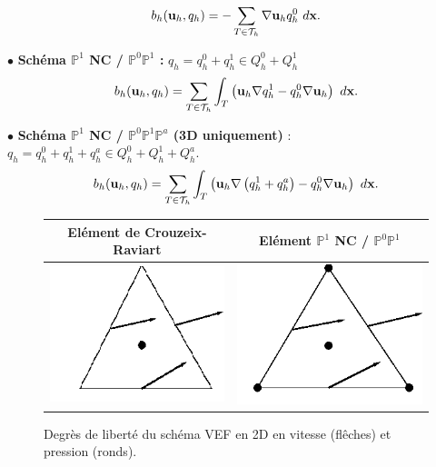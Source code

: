 \begin{appendix}
\begin{equation}
\ds{
b_h (\mbf{u}_h,q_h)=-\sum _{T\in \mathcal T _h}\nabla \mbf{u}_h q_h^0\ d\mbf x.
}
\end{equation}

$ \bullet $ {\bf{ Schéma $\mathbb P^1$ NC / $\mathbb P^0 \mathbb P^1$ :}} $q_h=q_h^0 + q_h^1\in Q_h^0 + Q_h^1$ \\

\begin{equation}
\ds{
b_h (\mbf{u}_h,q_h)=\sum _{T\in \mathcal T _h}\int _T \left( \mbf{u}_h\nabla  q_h^1- q_h^0 \nabla \mbf{u}_h \right) \ d\mbf x. 
}
\end{equation}

$ \bullet $ {\bf{ Sch\'ema $\mathbb P^1$ NC / $\mathbb P^0 \mathbb P^1 \mathbb P^a$ (3D uniquement)}} : $q_h=q_h^0 + q_h^1 + q_h^a \in Q_h^0 + Q_h^1 + Q_h^a$.\\

\begin{equation}
\ds{
b_h (\mbf{u}_h,q_h)=\sum _{T\in \mathcal T _h}\int _T \left( \mbf{u}_h\nabla  \left(q_h^1 + q_h^a \right) - q_h^0 \nabla \mbf{u}_h \right) \ d\mbf x.  
}
\end{equation}




\begin{figure}[h]
\begin{center}
\begin{tabular}{cc}
\hline \rowcolor{lightgray}
El\'ement de Crouzeix-Raviart & El\'ement $\mathbb P^1$ NC / $\mathbb P^0 \mathbb P^1$ \\
\hline
\includegraphics[scale=0.5]{Figs/VEF-P0.png}&
\includegraphics[scale=0.5]{Figs/VEF-P0P1.png}
\end{tabular}
\end{center}
\caption{Degr\`es de libert\'e du sch\'ema VEF en 2D en vitesse (fl\^eches) et pression (ronds).}
\end{figure}


\end{appendix}
